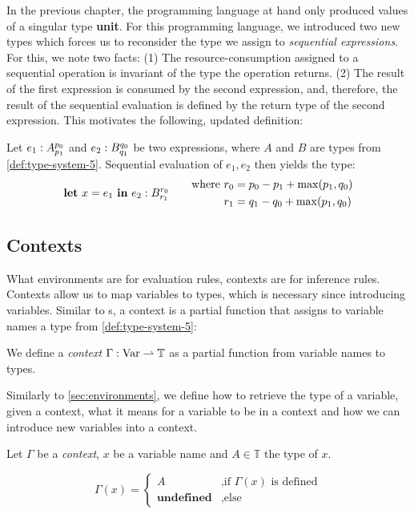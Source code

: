 In the previous chapter, the programming language at hand only produced values of a singular type \textbf{unit}. For this programming language, we introduced two new types which forces us to reconsider the type we assign to \emph{sequential expressions}. For this, we note two facts: (1) The resource-consumption assigned to a sequential operation is invariant of the type the operation returns. (2) The result of the first expression is consumed by the second expression, and, therefore, the result of the sequential evaluation is defined by the return type of the second expression. This motivates the following, updated definition:

\begin{definition}
   Let \(e_1 : A ^{p_0}_{p_1}\) and \(e_2 : B ^{q_0}_{q_1}\) be two expressions, where \(A\) and \(B\) are types from \cref{def:type-system-5}. Sequential evaluation of \(e_1, e_2\) then yields the type:
   \[
      \mathbf{let}~x = e_1~\mathbf{in}~e_2 : B ^{r_0}_{r_1}
      \qquad
      \begin{aligned}
	 \text{where }	&r_0 = p_0 - p_1 + \max(p_1, q_0) \\
			&r_1 = q_1 - q_0 + \max(p_1, q_0)
      \end{aligned}
   \]
\end{definition}

\subsection{Contexts}

What environments are for evaluation rules, contexts are for inference rules. Contexts allow us to map variables to types, which is necessary since introducing variables. Similar to s, a context is a partial function that assigns to variable names a type from \cref{def:type-system-5}:

\begin{definition}[Context]\label{def:context}
   We define a \emph{context} \(\Gamma : \text{Var} \rightharpoonup \text{\ensuremath{\mathbb{T}}}\) as a partial function from variable names to types.
\end{definition}

Similarly to \cref{sec:environments}, we define how to retrieve the type of a variable, given a context, what it means for a variable to be in a context and how we can introduce new variables into a context. 

\begin{definition}\label{def:context-getter}
   Let \(\Gamma\) be a \emph{context}, \(x\) be a variable name and \(A \in \mathbb{T}\) the type of \(x\). 

   \[
      \Gamma(x) = 
      \begin{cases}
	 A		      & \mbox{,if } \Gamma(x) \text{ is defined}\\
	 \textbf{undefined}   & \mbox{,else } 
      \end{cases}
   \]

\end{definition}

